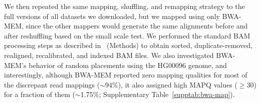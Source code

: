 \documentclass[10pt,a4paper]{article}
\begin{document}
We then repeated the same mapping, shuffling, and remapping strategy to the full versions of all datasets we downloaded, but we mapped using only BWA-MEM, since the other mappers 
would generate the same alignments before and after reshuffling based on the small scale test. We performed the standard BAM processing steps as described 
in~\cite{VanderAuwera2013} (Methods) to obtain sorted, duplicate-removed, realigned, recalibrated, and indexed BAM files. We also investigated BWA-MEM's behavior of random placements using the
HG00096 genome, and interestingly, although BWA-MEM reported zero mapping qualities for 
most of the discrepant read mappings ($\sim$94\%), it also assigned high MAPQ values ($\geq$30) for a fraction of them  ($\sim$1.75\%; Supplementary Table~\ref{supptab:bwa-map}). 


\end{document}
